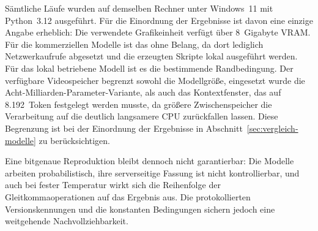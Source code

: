 Sämtliche Läufe wurden auf demselben Rechner unter Windows~11 mit Python~3.12 ausgeführt. Für die Einordnung der Ergebnisse ist davon eine einzige Angabe erheblich: Die verwendete Grafikeinheit verfügt über 8~Gigabyte \ac{VRAM}. Für die kommerziellen Modelle ist das ohne Belang, da dort lediglich Netzwerkaufrufe abgesetzt und die erzeugten Skripte lokal ausgeführt werden. Für das lokal betriebene Modell ist es die bestimmende Randbedingung. Der verfügbare Videospeicher begrenzt sowohl die Modellgröße, eingesetzt wurde die Acht-Milliarden-Parameter-Variante, als auch das Kontextfenster, das auf 8.192~Token festgelegt werden musste, da größere Zwischenspeicher die Verarbeitung auf die deutlich langsamere CPU zurückfallen lassen. Diese Begrenzung ist bei der Einordnung der Ergebnisse in Abschnitt~\ref{sec:vergleich-modelle} zu berücksichtigen.

Eine bitgenaue Reproduktion bleibt dennoch nicht garantierbar: Die Modelle arbeiten probabilistisch, ihre serverseitige Fassung ist nicht kontrollierbar, und auch bei fester Temperatur wirkt sich die Reihenfolge der Gleitkommaoperationen auf das Ergebnis aus. Die protokollierten Versionskennungen und die konstanten Bedingungen sichern jedoch eine weitgehende Nachvollziehbarkeit.
